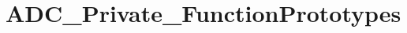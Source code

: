 \hypertarget{group___a_d_c___private___function_prototypes}{\section{A\-D\-C\-\_\-\-Private\-\_\-\-Function\-Prototypes}
\label{group___a_d_c___private___function_prototypes}
}
